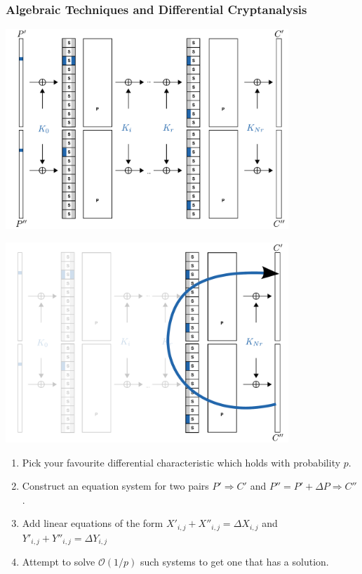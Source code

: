 \documentclass[9pt]{beamer}
\begin{document}
\begin{frame}[allowframebreaks]
\frametitle{Algebraic Techniques and Differential Cryptanalysis} 

\begin{center}
 \includegraphics[width=0.8\textwidth]{./attack-a.pdf}
\end{center}

\framebreak

\begin{center}
 \includegraphics[width=0.8\textwidth]{./attack-c-a.pdf}
\end{center}

\framebreak

\begin{enumerate}
 \item Pick your favourite differential characteristic which holds with probability $p$.
 \item Construct an equation system for two pairs $P'\Rightarrow C'$ and $P'' = P' + \Delta P \Rightarrow C''$.
 \item Add linear equations of the form $X'_{i,j} + X''_{i,j} = \Delta X_{i,j}$  and $Y'_{i,j} + Y''_{i,j} = \Delta Y_{i,j}$ 
 \item Attempt to solve $\mathcal{O}(1/p)$ such systems to get one that has a solution.
\end{enumerate}


\end{frame}
\end{document}
